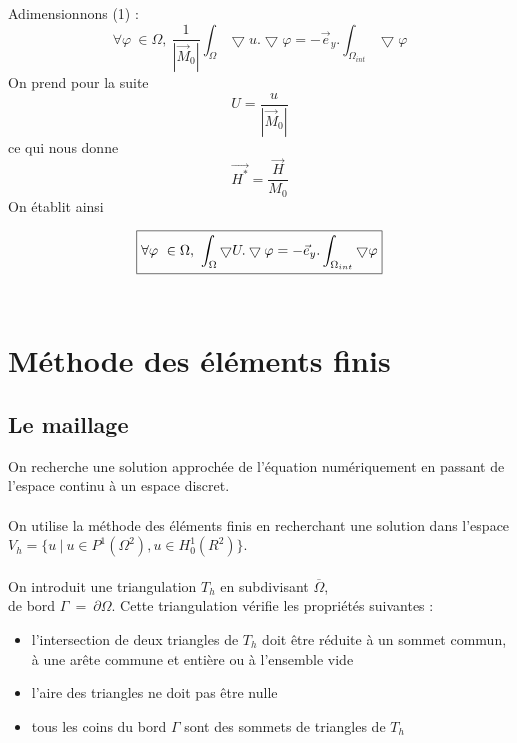 \documentclass[a4paper,12pt,titlepage]{report}
\begin{document}
\begin{onehalfspace}
Adimensionnons (1)				:
\[
	\forall \varphi\  \in \Omega,\  \frac{1}{|\vec{M}_{0}|}\int_{\Omega}\bigtriangledown u.\bigtriangledown \varphi
	= -\vec{e}_{y}.\int_{\Omega_{int}}\bigtriangledown \varphi
\]
On prend pour la suite \[U =  \frac{u}{|\vec{M}_{0}|}  \] ce qui nous donne \[\vec{H^*} =\frac{\vec{H}}{M_0} \]
On établit ainsi \label{A}

\begin{equation}
\boxed{
\label{A}
	\forall \varphi\  \in \Omega,\ \int_{\Omega}\bigtriangledown U.\bigtriangledown \varphi
	=- \vec{e}_{y}.\int_{\Omega_{int}}\bigtriangledown \varphi}
\end{equation}
\\

\section{Méthode des éléments finis}

\subsection{Le maillage}
On recherche une solution approchée de l'équation numériquement en passant de l'espace continu à un espace discret. \\
\\
On utilise la méthode des éléments finis en recherchant une solution dans l'espace 
$V_{h} = \{u \ | \ u \in P^{1}(\Omega^{2}), u \in H^{1}_{0}(R^{2})\}$. \\
\\
On introduit une triangulation $T_{h}$ en subdivisant $\overline{\Omega}$, \\ de bord $\Gamma \ = \ \partial\Omega$. 
\newpage
Cette triangulation vérifie les propriétés suivantes :
\\
\begin{itemize}
  \item l’intersection de deux triangles de $T_{h}$ doit être réduite à un sommet commun,\\ à une arête commune et entière ou à l'ensemble vide
  \item l’aire des triangles ne doit pas être nulle
  \item tous les coins du bord $\Gamma$ sont des sommets de triangles de $T_{h}$
\end{itemize}


\end{onehalfspace}
\end{document}
